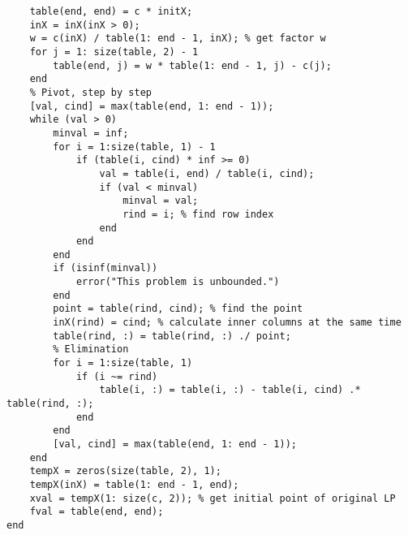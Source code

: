 \documentclass[bwprint, withouttitlepage]{mathexpthesis}
\begin{document}
\begin{verbatim}
    table(end, end) = c * initX;
    inX = inX(inX > 0);
    w = c(inX) / table(1: end - 1, inX); % get factor w
    for j = 1: size(table, 2) - 1
        table(end, j) = w * table(1: end - 1, j) - c(j);
    end
    % Pivot, step by step
    [val, cind] = max(table(end, 1: end - 1));
    while (val > 0)
        minval = inf;
        for i = 1:size(table, 1) - 1
            if (table(i, cind) * inf >= 0)
                val = table(i, end) / table(i, cind);
                if (val < minval)
                    minval = val;
                    rind = i; % find row index
                end
            end
        end
        if (isinf(minval))
            error("This problem is unbounded.")
        end
        point = table(rind, cind); % find the point
        inX(rind) = cind; % calculate inner columns at the same time
        table(rind, :) = table(rind, :) ./ point;
        % Elimination
        for i = 1:size(table, 1)
            if (i ~= rind)
                table(i, :) = table(i, :) - table(i, cind) .* table(rind, :); 
            end
        end
        [val, cind] = max(table(end, 1: end - 1));
    end
    tempX = zeros(size(table, 2), 1);
    tempX(inX) = table(1: end - 1, end);
    xval = tempX(1: size(c, 2)); % get initial point of original LP
    fval = table(end, end);
end
\end{verbatim}
\end{document}
